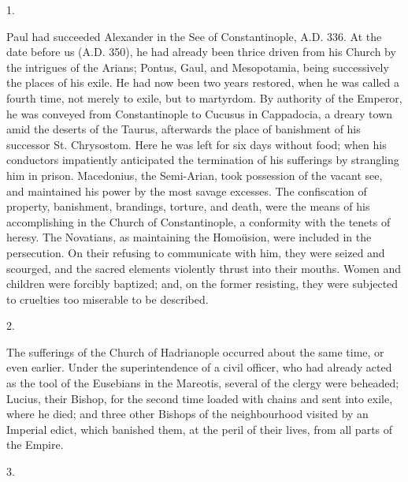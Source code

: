 1.

Paul had succeeded Alexander in the See of Constantinople, A.D.
336. At the date before us (A.D. 350), he had
already been thrice driven from his Church by the intrigues of the
Arians; Pontus, Gaul, and Mesopotamia, being successively the places
of his exile. He had now been two years restored, when he was called a
fourth time, not merely to exile, but to martyrdom. By authority of
the Emperor, he was conveyed from Constantinople to Cucusus in
Cappadocia, a dreary town amid the deserts of the Taurus, afterwards
the place of banishment of his successor St. Chrysostom. Here he was
left for six days without food; when his conductors impatiently
anticipated the termination of his sufferings by strangling him in
prison. Macedonius, the Semi-Arian, took possession of the vacant see,
and maintained his power by the most savage excesses. The confiscation
of property, banishment, brandings, torture, and death, were the means
of his accomplishing in the Church of Constantinople, a conformity
with the tenets of heresy. The Novatians, as maintaining the
Homoüsion, were included in the persecution. On their refusing to
communicate with him, they were seized and scourged, and the
sacred elements violently thrust into their mouths. Women and children
were forcibly baptized; and, on the former resisting, they were
subjected to cruelties too miserable to be described.

2.

The sufferings of the Church of Hadrianople occurred about the same
time, or even earlier. Under the superintendence of a civil officer,
who had already acted as the tool of the Eusebians in the Mareotis,
several of the clergy were beheaded; Lucius, their Bishop, for the
second time loaded with chains and sent into exile, where he died; and
three other Bishops of the neighbourhood visited by an Imperial edict,
which banished them, at the peril of their lives, from all parts of
the Empire.

3.

